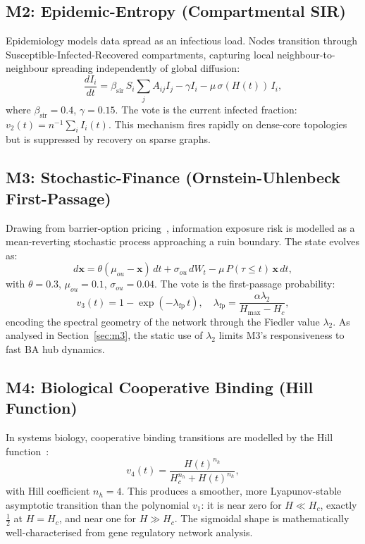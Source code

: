 \documentclass[review,12pt]{elsarticle}
\newcommand{\bfx}{\mathbf{x}}
\newcommand{\Hc}{H_c}
\newcommand{\Hmax}{H_{\max}}
\newcommand{\lambdat}{\lambda_2}
\begin{document}
\subsection{M2: Epidemic-Entropy (Compartmental SIR)}

Epidemiology models data spread as an infectious load. Nodes transition
through Susceptible-Infected-Recovered compartments, capturing local
neighbour-to-neighbour spreading independently of global diffusion:
\begin{equation}
  \frac{dI_i}{dt} = \beta_{\mathrm{sir}}\,S_i \sum_j A_{ij} I_j
                   - \gamma I_i - \mu\,\sigma(H(t))\,I_i,
  \label{eq:sir}
\end{equation}
where $\beta_{\mathrm{sir}} = 0.4$, $\gamma = 0.15$. The vote is the
current infected fraction: $v_2(t) = n^{-1}\!\sum_i I_i(t)$. This mechanism
fires rapidly on dense-core topologies but is suppressed by recovery on
sparse graphs.

\subsection{M3: Stochastic-Finance (Ornstein-Uhlenbeck First-Passage)}

Drawing from barrier-option pricing~\cite{black1973pricing,uhlenbeck1930theory},
information exposure risk is modelled as a mean-reverting stochastic process
approaching a ruin boundary. The state evolves as:
\begin{equation}
  d\bfx = \theta(\mu_{ou} - \bfx)\,dt + \sigma_{ou}\,dW_t
         - \mu\,P(\tau \leq t)\,\bfx\,dt,
  \label{eq:finance}
\end{equation}
with $\theta = 0.3$, $\mu_{ou} = 0.1$, $\sigma_{ou} = 0.04$. The vote
is the first-passage probability:
\begin{equation}
  v_3(t) = 1 - \exp\!\left(-\lambda_{\mathrm{fp}}\,t\right), \quad
  \lambda_{\mathrm{fp}} = \frac{\alpha\lambdat}{\Hmax - \Hc},
  \label{eq:v3}
\end{equation}
encoding the spectral geometry of the network through the Fiedler
value $\lambdat$. As analysed in Section~\ref{sec:m3}, the static use
of $\lambdat$ limits M3's responsiveness to fast BA hub dynamics.

\subsection{M4: Biological Cooperative Binding (Hill Function)}

In systems biology, cooperative binding transitions are modelled by the
Hill function~\cite{alon2019systems}:
\begin{equation}
  v_4(t) = \frac{H(t)^{n_h}}{H_c^{n_h} + H(t)^{n_h}},
  \label{eq:hill}
\end{equation}
with Hill coefficient $n_h = 4$. This produces a smoother, more
Lyapunov-stable asymptotic transition than the polynomial $v_1$: it is
near zero for $H \ll \Hc$, exactly $\tfrac{1}{2}$ at $H = \Hc$, and
near one for $H \gg \Hc$. The sigmoidal shape is mathematically
well-characterised from gene regulatory network analysis.
\end{document}
